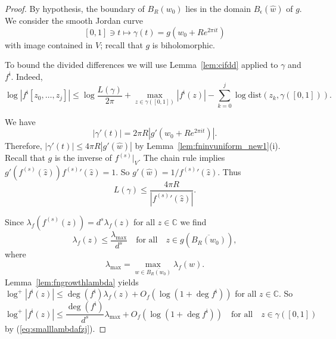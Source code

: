 \documentclass[12pt,oneside,a4]{amsart}
\newcommand{\IC}{\mathbb{C}}
\numberwithin{maincounter}{section}
\numberwithin{equation}{section}
\begin{document}
\begin{proof} 
  By hypothesis,  the boundary of $B_R(w_0)$ lies in the domain
  $B_\epsilon(\widehat w)$ of $g$.  We consider the  smooth Jordan curve
  \begin{equation}
    \label{eq:defjordancurve}
    [0,1]\ni t\mapsto \gamma(t) = g\left(w_0+R e^{2\pi it}\right)
  \end{equation}
  with image contained in $V$; recall that $g$ is biholomorphic.

  To bound the divided differences we
  will use  Lemma~\ref{lem:cifdd} applied to
  $\gamma$ and $f^{\mathfrak{i}}$.
  Indeed, 
  \begin{equation}
    \label{eq:fiddbound1_0}
    \log |f^{\mathfrak{i}}[z_0,\ldots,z_j]| \le
    \log \frac{L(\gamma)}{2\pi} + \max_{z\in
      \gamma([0,1])}|f^{\mathfrak{i}}(z)|
    -\sum_{k=0}^j \log
    \mathrm{dist}(z_k,\gamma([0,1])).
  \end{equation}


  We have
  \begin{equation*}
    |\gamma'(t)| = 2\pi R \left|g'( w_0+ R e^{2\pi it})\right|.
  \end{equation*}
  Therefore, $|\gamma'(t)|\le {4\pi} R|g'(\widehat w)|$ by
  Lemma~\ref{lem:fninvuniform_new1}(i).  
  Recall that $g$ is the inverse of $f^{(s)}|_V$. The chain
  rule implies $g'(f^{(s)}(\widehat z)) {f^{(s)}}'(\widehat z)=1$. So
  $g'(\widehat w) = 1/{f^{(s)}}'(\widehat z)$. Thus
  \begin{equation}
    \label{eq:Lgammabound}
    L(\gamma)\le     \frac{4\pi R}{|{f^{(s)}}'(\widehat z)|}.  
  \end{equation}

  Since
  $\lambda_f(f^{(s)}(z)) = d^s\lambda_f(z)$ for all $z\in\IC$ we find
  \begin{equation}
    \label{eq:smalllambdafzj}
    \lambda_f(z)
    \le \frac{\lambda_{\mathrm{max}}}{d^s}\quad\text{for all}\quad
    z\in g(\overline{B_{R}(w_0)}),
  \end{equation}
  where
  \begin{equation*}
    \lambda_{\mathrm{max}} = \max_{w\in \overline{B_R(w_0)}} \lambda_f(w).
  \end{equation*}
  Lemma~\ref{lem:fngrowthlambda}
  yields
  $\log^+ |f^{\mathfrak i}(z)| \le \deg(f^{\mathfrak i}) \lambda_f(z)+  O_f(\log(1+  \deg f^{\mathfrak i}))$
     for all $z\in\IC$.
  So
  \begin{equation}
    \label{eq:absffrakibd}
    \log^+ |f^{\mathfrak i}(z)| \le
    \frac{\deg(f^{\mathfrak i})}{d^s}\lambda_{\mathrm{max}}+
    O_f\left(\log(1+  \deg f^{\mathfrak i})\right)
    \quad\text{for all}\quad z\in \gamma([0,1])
  \end{equation}
  by (\ref{eq:smalllambdafzj}).


\end{proof}
\end{document}
